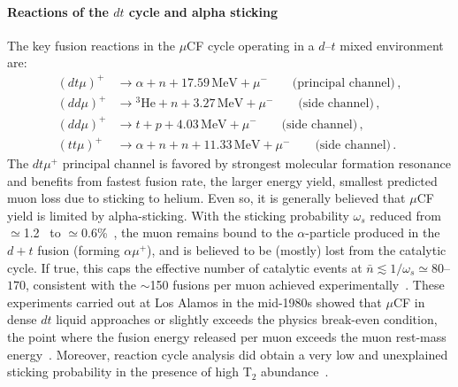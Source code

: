 \documentclass[particles,article,accept,pdftex,moreauthors]{Definitions/mdpi}
\begin{document}
\paragraph*{\bf Reactions of the $dt$ cycle and alpha sticking}
The key fusion reactions in the $\mu$CF cycle operating in a $d$--$t$ mixed environment are:
\begin{align}
(dt\mu)^+ &\to \alpha + n + 17.59\,\mathrm{MeV} + \mu^- \qquad \text{(principal channel)}\,,\\
(dd\mu)^+ &\to {}^3\mathrm{He} + n + 3.27\,\mathrm{MeV} + \mu^- \qquad \text{(side channel)}\,,\\
(dd\mu)^+ &\to t + p + 4.03\,\mathrm{MeV} + \mu^- \qquad \text{(side channel)}\,,\\
(tt\mu)^+ &\to \alpha + n + n + 11.33\,\mathrm{MeV} + \mu^- \qquad \text{(side channel)}\,.
\end{align}
The $dt\mu^+$ principal channel is favored by strongest molecular formation resonance and benefits from fastest fusion rate, the larger energy yield, smallest predicted muon loss due to sticking to helium. Even so, it is generally believed that $\mu$CF yield is limited by alpha-sticking. With the sticking probability $\omega_s$ reduced from $\simeq$1.2~\cite{Jackson:1957zza} to $\simeq$0.6\%~\cite{jones1993evaluation,Rafelski:1988wq,Jones1997}, the muon remains bound to the $\alpha$-particle produced in the $d+t$ fusion (forming $\alpha\mu^+$), and is believed to be (mostly) lost from the catalytic cycle. If true, this caps the effective number of catalytic events at $\bar{n}\lesssim 1/\omega_s\simeq 80$--$170$, consistent with the $\sim$150 fusions per muon achieved experimentally~\cite{Jones:1983pw,Jones:1986kk}. These experiments carried out at Los Alamos in the mid-1980s showed that $\mu$CF in dense $dt$ liquid approaches or slightly exceeds the physics break-even condition, the point where the fusion energy released per muon exceeds the muon rest-mass energy~\cite{Rafelski:1990in}. Moreover, reaction cycle analysis did obtain a very low and unexplained sticking probability in the presence of high T$_2$ abundance~\cite{jones1993evaluation}.
\end{document}
